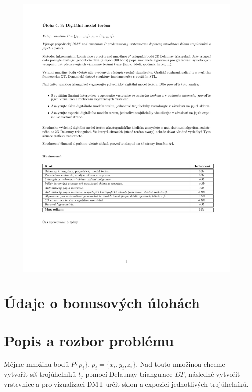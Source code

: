 \documentclass[a4paper, 12pt]{article}
\begin{document}
\begin{figure}[h!]
	\includegraphics[clip, trim=0cm 5cm 0cm 3cm, width=1.0\textwidth]{zadani.pdf}
\end{figure}


\section{Údaje o bonusových úlohách}




\clearpage

\section{Popis a rozbor problému}

Mějme množinu bodů $P \{p_i\}$,  $p_i = \{x_i, y_i, z_i\}$. Nad touto množinou chceme vytvořit síť trojúhelníků $t_j$ pomocí Delaunay triangulace $DT$, následně vytvořit vrstevnice a pro vizualizaci DMT určit sklon a expozici jednotlivých trojúhelníků.\\ 
\end{document}

